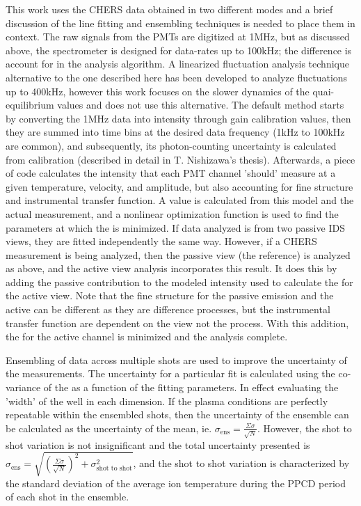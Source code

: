 This work uses the CHERS data obtained in two different modes and a brief discussion of the line fitting and ensembling techniques is needed to place them in context. The raw signals from the PMTs are digitized at 1MHz, but as discussed above, the spectrometer is designed for data-rates up to 100kHz; the difference is account for in the analysis algorithm. A linearized fluctuation analysis technique alternative to the one described here has been developed to analyze fluctuations up to 400kHz\cite{Nishizawa2017}, however this work focuses on the slower dynamics of the quai-equilibrium values and does not use this alternative. The default method starts by converting the 1MHz data into intensity through gain calibration values, then they are summed into time bins at the desired data frequency (1kHz to 100kHz are common), and subsequently, its photon-counting uncertainty is calculated from calibration (described in detail in T. Nishizawa's thesis\cite{Nishizawa2018}). Afterwards, a piece of code calculates the intensity that each PMT channel 'should' measure at a given temperature, velocity, and amplitude, but also accounting for fine structure and instrumental transfer function. A \chisq value is calculated from this model and the actual measurement, and a nonlinear optimization function is used to find the parameters at which the \chisq is minimized. If data analyzed is from two passive IDS views, they are fitted independently the same way. However, if a CHERS measurement is being analyzed, then the passive view (the reference) is analyzed as above, and the active view analysis incorporates this result. It does this by adding the passive contribution to the modeled intensity used to calculate the \chisq for the active view. Note that the fine structure for the passive emission and the active can be different as they are difference processes, but the instrumental transfer function are dependent on the view not the process. With this addition, the \chisq for the active channel is minimized and the analysis complete.

Ensembling of data across multiple shots are used to improve the uncertainty of the measurements. The uncertainty for a particular fit is calculated using the co-variance of the \chisq as a function of the fitting parameters. In effect evaluating the 'width' of the \chisq well in each dimension. If the plasma conditions are perfectly repeatable within the ensembled shots, then the uncertainty of the ensemble can be calculated as the uncertainty of the mean, ie. $\sigma_{\text{ens}} = \frac{\Sigma \sigma}{\sqrt{N}}$. However, the shot to shot variation is not insignificant and the total uncertainty presented is $\sigma_{\text{ens}} = \sqrt{ (\frac{\Sigma \sigma}{\sqrt{N}})^2 + \sigma_{\text{shot to shot}}^2}$, and the shot to shot variation is characterized by the standard deviation of the average ion temperature during the PPCD period of each shot in the ensemble.

